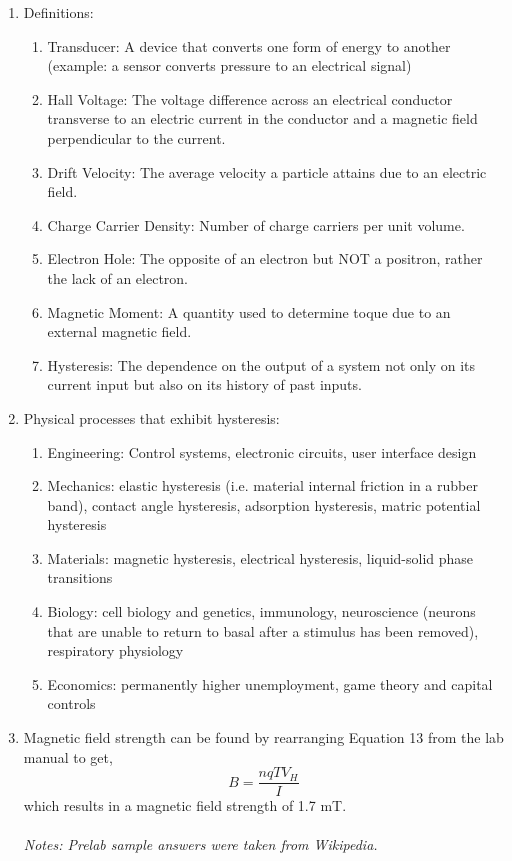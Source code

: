 \begin{enumerate}
\item Definitions:
  \begin{enumerate}
  \item Transducer: A device that converts one form of energy to another (example: a sensor converts pressure to an electrical signal)
  \item Hall Voltage: The voltage difference across an electrical conductor transverse to an electric current in the conductor and a magnetic field perpendicular to the current.
  \item Drift Velocity: The average velocity a particle attains due to an electric field.
  \item Charge Carrier Density: Number of charge carriers per unit volume.
  \item Electron Hole: The opposite of an electron but NOT a positron, rather the lack of an electron.
  \item Magnetic Moment: A quantity used to determine toque due to an external magnetic field.
  \item Hysteresis: The dependence on the output of a system not only on its current input but also on its history of past inputs.
  \end{enumerate}
\item Physical processes that exhibit hysteresis:
  \begin{enumerate}
  \item Engineering: Control systems, electronic circuits, user interface design
  \item Mechanics: elastic hysteresis (i.e. material internal friction in a rubber band), contact angle hysteresis, adsorption hysteresis, matric potential hysteresis
  \item Materials: magnetic hysteresis, electrical hysteresis, liquid-solid phase transitions
  \item Biology: cell biology and genetics, immunology, neuroscience (neurons that are unable to return to basal after a stimulus has been removed), respiratory physiology
  \item Economics: permanently higher unemployment, game theory and capital controls
  \end{enumerate}
\item Magnetic field strength can be found by rearranging Equation 13 from the lab manual to get,
$$
B=\frac{nqTV_H}{I}
$$
which results in a magnetic field strength of 1.7 mT.
\\
\\
\textit{Notes: Prelab sample answers were taken from Wikipedia.}
\end{enumerate}

